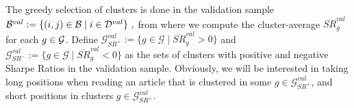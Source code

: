 


The greedy selection of clusters is done in the validation sample 
$
\mathcal{B}^{val}:= \{
(i,j)\in\mathcal{B} 
 \mid 
  i \in \mathcal{D}^{val} \}
~,
$
from where we compute the cluster-average $\overline{S R}_g^{val}$ for each $g\in\mathcal{G}$.
%
Define $\mathcal G_{SR^+}^{val}:=\{ g\in \mathcal G \mid \overline{SR}_g^{val} >0\}$ and $\mathcal G_{SR^-}^{val}:=\{ g\in \mathcal G \mid \overline{SR}_g^{val} <0\}$ as the sets of clusters with positive and negative Sharpe Ratios in the validation sample. Obviously, we will be interested in taking long positions when reading an article that is clustered in some $g\in \mathcal G_{SR^+}^{val}$, and short positions in clusters $g\in \mathcal G_{SR^+}^{val}$. 


